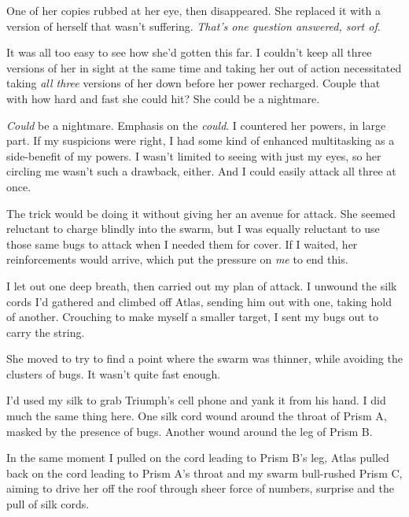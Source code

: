 One of her copies rubbed at her eye, then disappeared.  She replaced it with a version of herself that wasn't suffering.  \emph{That's one question answered, sort of}.



It was all too easy to see how she'd gotten this far.  I couldn't keep all three versions of her in sight at the same time and taking her out of action necessitated taking \emph{all three} versions of her down before her power recharged.  Couple that with how hard and fast she could hit?  She could be a nightmare.



\emph{Could }be a nightmare.  Emphasis on the \emph{could}.  I countered her powers, in large part.  If my suspicions were right, I had some kind of enhanced multitasking as a side-benefit of my powers.  I wasn't limited to seeing with just my eyes, so her circling me wasn't such a drawback, either.  And I could easily attack all three at once.



The trick would be doing it without giving her an avenue for attack.  She seemed reluctant to charge blindly into the swarm, but I was equally reluctant to use those same bugs to attack when I needed them for cover.  If I waited, her reinforcements would arrive, which put the pressure on \emph{me} to end this.



I let out one deep breath, then carried out my plan of attack.  I unwound the silk cords I'd gathered and climbed off Atlas, sending him out with one, taking hold of another.  Crouching to make myself a smaller target, I sent my bugs out to carry the string.



She moved to try to find a point where the swarm was thinner, while avoiding the clusters of bugs.  It wasn't quite fast enough.



I'd used my silk to grab Triumph's cell phone and yank it from his hand.  I did much the same thing here.  One silk cord wound around the throat of Prism A, masked by the presence of bugs.  Another wound around the leg of Prism B.



In the same moment I pulled on the cord leading to Prism B's leg, Atlas pulled back on the cord leading to Prism A's throat and my swarm bull-rushed Prism C, aiming to drive her off the roof through sheer force of numbers, surprise and the pull of silk cords.



